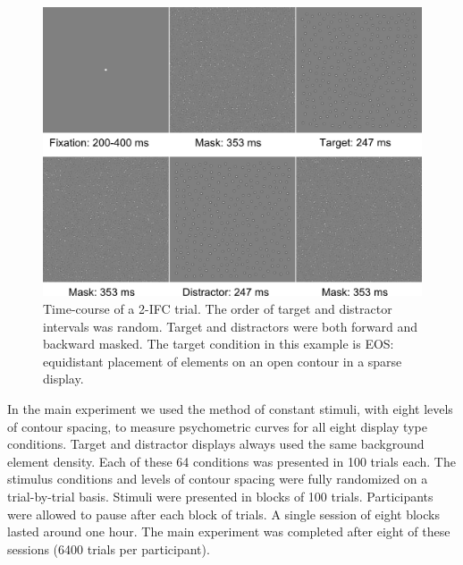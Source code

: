 \documentclass[12pt]{article}
\begin{document}
\begin{figure}[h]
\includegraphics{Figures/FIG_trial.png}
\caption{Time-course of a 2-IFC trial. The order of target and distractor intervals was random. Target and distractors were both forward and backward masked. The target condition in this example is EOS: equidistant placement of elements on an open contour in a sparse display.}
\label{fig_trial}
\end{figure}

In the main experiment we used the method of constant stimuli, with eight levels of contour spacing, to measure psychometric curves for all eight display type conditions. Target and distractor displays always used the same background element density. Each of these 64 conditions was presented in 100 trials each. The stimulus conditions and levels of contour spacing were fully randomized on a trial-by-trial basis. Stimuli were presented in blocks of 100 trials. Participants were allowed to pause after each block of trials. A single session of eight blocks lasted around one hour. The main experiment was completed after eight of these sessions (6400 trials per participant).\\
\end{document}
